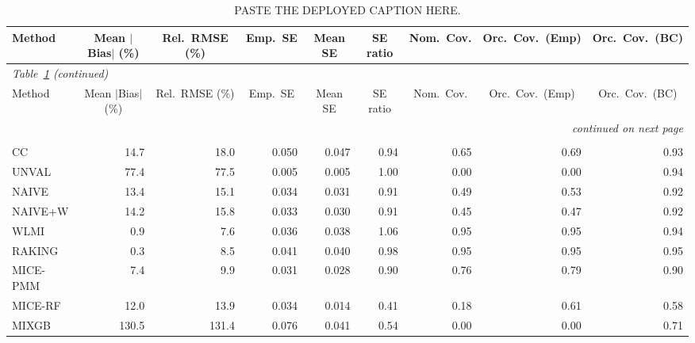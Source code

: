  
\begin{longtable}{lrrrrrrrr}
\caption{PASTE THE DEPLOYED CAPTION HERE.}
\label{tab:appc_sisl} \\
\toprule
Method & \multicolumn{1}{c}{Mean $|$Bias$|$ (\%)} & \multicolumn{1}{c}{Rel.\ RMSE (\%)} & \multicolumn{1}{c}{Emp.\ SE} & \multicolumn{1}{c}{Mean SE} & \multicolumn{1}{c}{SE ratio} & \multicolumn{1}{c}{Nom.\ Cov.} & \multicolumn{1}{c}{Orc.\ Cov.\ (Emp)} & \multicolumn{1}{c}{Orc.\ Cov.\ (BC)} \\
\midrule \endfirsthead
\multicolumn{9}{l}{\footnotesize\itshape Table~\ref{tab:appc_sisl} (continued)} \\ \toprule
Method & \multicolumn{1}{c}{Mean $|$Bias$|$ (\%)} & \multicolumn{1}{c}{Rel.\ RMSE (\%)} & \multicolumn{1}{c}{Emp.\ SE} & \multicolumn{1}{c}{Mean SE} & \multicolumn{1}{c}{SE ratio} & \multicolumn{1}{c}{Nom.\ Cov.} & \multicolumn{1}{c}{Orc.\ Cov.\ (Emp)} & \multicolumn{1}{c}{Orc.\ Cov.\ (BC)} \\
\midrule \endhead
\midrule \multicolumn{9}{r}{\footnotesize\itshape continued on next page} \\
\endfoot
\bottomrule \endlastfoot
\multicolumn{9}{l}{\textbf{Continuous Phase-Two Covariates}} \\
\addlinespace[2pt]
CC & 14.7 & 18.0 & 0.050 & 0.047 & 0.94 & 0.65 & 0.69 & 0.93 \\
UNVAL & 77.4 & 77.5 & 0.005 & 0.005 & \cellcolor{rankone}1.00 & 0.00 & 0.00 & \cellcolor{rankthree}0.94 \\
NAIVE & 13.4 & 15.1 & 0.034 & 0.031 & 0.91 & 0.49 & 0.53 & 0.92 \\
NAIVE+W & 14.2 & 15.8 & 0.033 & 0.030 & 0.91 & 0.45 & 0.47 & 0.92 \\
WLMI & \cellcolor{ranktwo}0.9 & \cellcolor{rankone}7.6 & 0.036 & 0.038 & 1.06 & \cellcolor{rankone}0.95 & \cellcolor{rankthree}0.95 & \cellcolor{ranktwo}0.94 \\
RAKING & \cellcolor{rankone}0.3 & \cellcolor{rankthree}8.5 & 0.041 & 0.040 & \cellcolor{ranktwo}0.98 & \cellcolor{ranktwo}0.95 & 0.95 & \cellcolor{rankone}0.95 \\
MICE-PMM & 7.4 & 9.9 & 0.031 & 0.028 & 0.90 & 0.76 & 0.79 & 0.90 \\
MICE-RF & 12.0 & 13.9 & 0.034 & 0.014 & 0.41 & 0.18 & 0.61 & 0.58 \\
MIXGB & 130.5 & 131.4 & 0.076 & 0.041 & 0.54 & 0.00 & 0.00 & 0.71 \\

\end{longtable}
